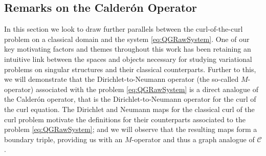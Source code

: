 \subsection{Remarks on the Calder\'on Operator} \label{ssec:CalderonOp}
In this section we look to draw further parallels between the curl-of-the-curl problem on a classical domain and the system \eqref{eq:QGRawSystem}.
One of our key motivating factors and themes throughout this work has been retaining an intuitive link between the spaces and objects necessary for studying variational problems on singular structures and their classical counterparts.
Further to this, we will demonstrate that the Dirichlet-to-Neumann operator (the so-called $M$-operator) associated with the problem \eqref{eq:QGRawSystem} is a direct analogue of the Calder\'on operator, that is the Dirichlet-to-Neumann operator for the curl of the curl equation.
The Dirichlet and Neumann maps for the classical curl of the curl problem motivate the definitions for their counterparts associated to the problem \eqref{eq:QGRawSystem}; and we will observe that the resulting maps form a boundary triple, providing us with an $M$-operator and thus a graph analogue of $\mathcal{C}$.

